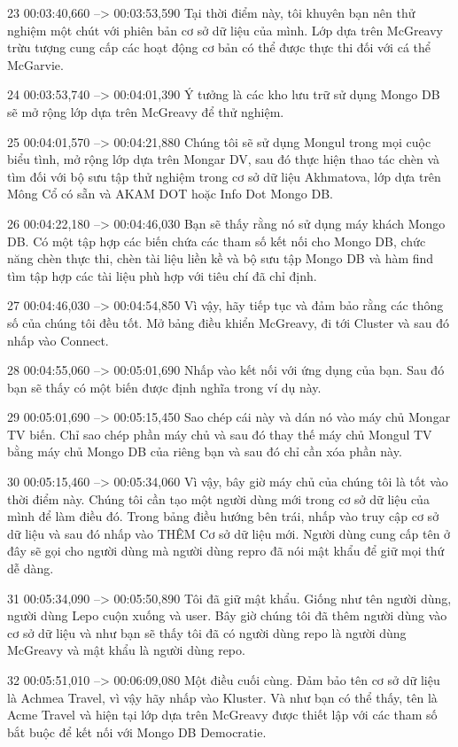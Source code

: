 23
00:03:40,660 --> 00:03:53,590
Tại thời điểm này, tôi khuyên bạn nên thử nghiệm một chút với phiên bản cơ sở dữ liệu của mình.  Lớp dựa trên McGreavy trừu tượng cung cấp các hoạt động cơ bản có thể được thực thi đối với cá thể McGarvie.

24
00:03:53,740 --> 00:04:01,390
Ý tưởng là các kho lưu trữ sử dụng Mongo DB sẽ mở rộng lớp dựa trên McGreavy để thử nghiệm.

25
00:04:01,570 --> 00:04:21,880
Chúng tôi sẽ sử dụng Mongul trong mọi cuộc biểu tình, mở rộng lớp dựa trên Mongar DV, sau đó thực hiện thao tác chèn và tìm đối với bộ sưu tập thử nghiệm trong cơ sở dữ liệu Akhmatova, lớp dựa trên Mông Cổ có sẵn và AKAM DOT hoặc Info Dot Mongo DB.

26
00:04:22,180 --> 00:04:46,030
Bạn sẽ thấy rằng nó sử dụng máy khách Mongo DB.  Có một tập hợp các biến chứa các tham số kết nối cho Mongo DB, chức năng chèn thực thi, chèn tài liệu liền kề và bộ sưu tập Mongo DB và hàm find tìm tập hợp các tài liệu phù hợp với tiêu chí đã chỉ định.

27
00:04:46,030 --> 00:04:54,850
Vì vậy, hãy tiếp tục và đảm bảo rằng các thông số của chúng tôi đều tốt.  Mở bảng điều khiển McGreavy, đi tới Cluster và sau đó nhấp vào Connect.

28
00:04:55,060 --> 00:05:01,690
Nhấp vào kết nối với ứng dụng của bạn.  Sau đó bạn sẽ thấy có một biến được định nghĩa trong ví dụ này.

29
00:05:01,690 --> 00:05:15,450
Sao chép cái này và dán nó vào máy chủ Mongar TV biến.  Chỉ sao chép phần máy chủ và sau đó thay thế máy chủ Mongul TV bằng máy chủ Mongo DB của riêng bạn và sau đó chỉ cần xóa phần này.

30
00:05:15,460 --> 00:05:34,060
Vì vậy, bây giờ máy chủ của chúng tôi là tốt vào thời điểm này.  Chúng tôi cần tạo một người dùng mới trong cơ sở dữ liệu của mình để làm điều đó.  Trong bảng điều hướng bên trái, nhấp vào truy cập cơ sở dữ liệu và sau đó nhấp vào THÊM Cơ sở dữ liệu mới. Người dùng cung cấp tên ở đây sẽ gọi cho người dùng mà người dùng repro đã nói mật khẩu để giữ mọi thứ dễ dàng.

31
00:05:34,090 --> 00:05:50,890
Tôi đã giữ mật khẩu.  Giống như tên người dùng, người dùng Lepo cuộn xuống và user.  Bây giờ chúng tôi đã thêm người dùng vào cơ sở dữ liệu và như bạn sẽ thấy tôi đã có người dùng repo là người dùng McGreavy và mật khẩu là người dùng repo.

32
00:05:51,010 --> 00:06:09,080
Một điều cuối cùng.  Đảm bảo tên cơ sở dữ liệu là Achmea Travel, vì vậy hãy nhấp vào Kluster.  Và như bạn có thể thấy, tên là Acme Travel và hiện tại lớp dựa trên McGreavy được thiết lập với các tham số bắt buộc để kết nối với Mongo DB Democratie.

